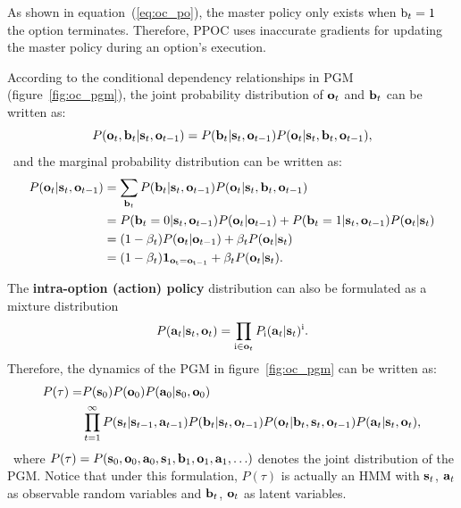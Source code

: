 As shown in equation~(\ref{eq:oc_po}), the master policy only
exists when ${\textnormal{b}}_t=1$ the option terminates. Therefore, PPOC
\cite{klissarov2017learnings} uses inaccurate gradients for
updating the master policy during an option's execution.

According to the conditional dependency relationships in PGM
(figure~\ref{fig:oc_pgm}), the joint probability distribution of
${\mathbf{o}}_t$ and ${\mathbf{b}}_t$ can be written as:
\begin{equation}
  \label{eq:oc_ob_p}
  P({\mathbf{o}}_t,{\mathbf{b}}_t|{\mathbf{s}}_t,{\mathbf{o}}_{t-1})=P({\mathbf{b}}_t|{\mathbf{s}}_t,{\mathbf{o}}_{t-1})P({\mathbf{o}}_t|{\mathbf{s}}_t, {\mathbf{b}}_t,{\mathbf{o}}_{t-1}),
\end{equation}
~and the marginal probability distribution can be written as:
\begin{align}
  \label{eq:oc_oso_p}
  P({\mathbf{o}}_t|{\mathbf{s}}_t,{\mathbf{o}}_{t-1})&=\sum_{{\mathbf{b}}_t}P({\mathbf{b}}_t|{\mathbf{s}}_t,{\mathbf{o}}_{t-1})P({\mathbf{o}}_t|{\mathbf{s}}_t, {\mathbf{b}}_t,{\mathbf{o}}_{t-1})\\
  \nonumber &=P({\mathbf{b}}_t=0|{\mathbf{s}}_t,{\mathbf{o}}_{t-1})P({\mathbf{o}}_t|{\mathbf{o}}_{t-1}) +P({\mathbf{b}}_t=1|{\mathbf{s}}_t,{\mathbf{o}}_{t-1})P({\mathbf{o}}_t|{\mathbf{s}}_t) \\
\nonumber                             &=(1-\beta_t)P({\mathbf{o}}_t|{\mathbf{o}}_{t-1}) +\beta_tP({\mathbf{o}}_t|{\mathbf{s}}_t)\\
  \nonumber&=(1-\beta_t)\bm{1}_\mathrm{{\mathbf{o}}_t={\mathbf{o}}_{t-1}} +\beta_tP({\mathbf{o}}_t|{\mathbf{s}}_t).
\end{align}

The \textbf{intra-option (action) policy} distribution can also
be formulated as a mixture distribution
\begin{equation}
  \label{eq:oc_a_p}
  P({\mathbf{a}}_t|{\mathbf{s}}_t,{\mathbf{o}}_t) = \prod_{{\textnormal{i}}\in{\mathbf{o}}_t}P_{{\textnormal{i}}}({\mathbf{a}}_t|{\mathbf{s}}_t)^{{\textnormal{i}}}.
\end{equation}
Therefore, the dynamics of the PGM in
figure~\ref{fig:oc_pgm} can be written as:
\begin{align}
  \label{eq:oc_pgm_joint}
\nonumber  P(\tau) = &P({\mathbf{s}}_0)P({\mathbf{o}}_0)P({\mathbf{a}}_0|{\mathbf{s}}_0,{\mathbf{o}}_0)\\
  &\prod_{t=1}^\infty P({\mathbf{s}}_t|{\mathbf{s}}_{t-1},{\mathbf{a}}_{t-1})P({\mathbf{b}}_t|{\mathbf{s}}_t,{\mathbf{o}}_{t-1})P({\mathbf{o}}_t|{\mathbf{b}}_t,{\mathbf{s}}_t,{\mathbf{o}}_{t-1})P({\mathbf{a}}_{t}|{\mathbf{s}}_{t},{\mathbf{o}}_{t}),
\end{align}
~where
$P(\tau)=P({\mathbf{s}}_0,{\mathbf{o}}_0,{\mathbf{a}}_0,{\mathbf{s}}_1,{\mathbf{b}}_1,{\mathbf{o}}_1,{\mathbf{a}}_1,\ldots)$
denotes the joint distribution of the PGM. Notice that under this
formulation, $P(\tau)$ is actually an HMM with ${\mathbf{s}}_t$, ${\mathbf{a}}_t$
as observable random variables and ${\mathbf{b}}_t$, ${\mathbf{o}}_t$ as latent
variables.

